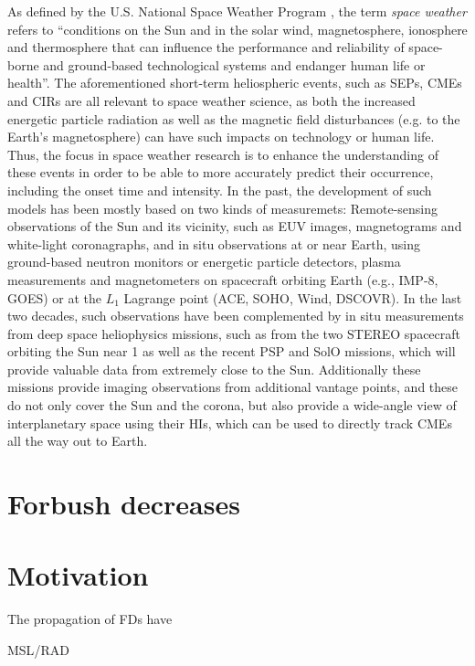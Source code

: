 As defined by the U.S. National Space Weather Program \parencite{OFCM-1995}, the term \textit{space weather} refers to ``conditions on the Sun and in the solar wind, magnetosphere, ionosphere and thermosphere that can influence the performance and reliability of space-borne and ground-based technological systems and endanger human life or health''.
The aforementioned short-term heliospheric events, such as \acp{SEP}, \acp{CME} and \acp{CIR} are all relevant to space weather science, as both the increased energetic particle radiation as well as the magnetic field disturbances (e.g. to the Earth's magnetosphere) can have such impacts on technology or human life.
Thus, the focus in space weather research is to enhance the understanding of these events in order to be able to more accurately predict their occurrence, including the onset time and intensity.
In the past, the development of such models has been mostly based on two kinds of measuremets: Remote-sensing observations of the Sun and its vicinity, such as EUV images, magnetograms and white-light coronagraphs, and in situ observations at or near Earth, using ground-based neutron monitors or energetic particle detectors, plasma measurements and magnetometers on spacecraft orbiting Earth (e.g., IMP-8, GOES) or at the $L_1$ Lagrange point (\acs{ACE}, \acs{SOHO}, Wind, \acs{DSCOVR}).
In the last two decades, such observations have been complemented by in situ measurements from deep space heliophysics missions, such as from the two \ac{STEREO} spacecraft orbiting the Sun near \SI{1}{\AU} as well as the recent \ac{PSP} and \ac{SolO} missions, which will provide valuable data from extremely close to the Sun. Additionally these missions provide imaging observations from additional vantage points, and these do not only cover the Sun and the corona, but also provide a wide-angle view of interplanetary space using their \acp{HI}, which can be used to directly track \acp{CME} all the way out to Earth.

\section{Forbush decreases}



\section{Motivation}

The propagation of 
\acp{FD} have 

\ac{MSL}/\ac{RAD}